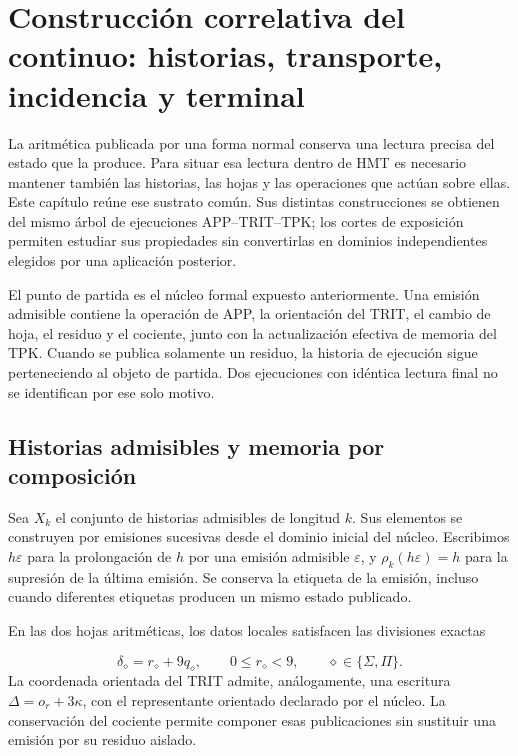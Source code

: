 \section{Construcción correlativa del continuo: historias, transporte, incidencia y terminal}
\label{viii:lectura:manuscrito-05}
La aritmética publicada por una forma normal conserva una lectura precisa del estado que la produce. Para situar esa lectura dentro de HMT es necesario mantener también las historias, las hojas y las operaciones que actúan sobre ellas. Este capítulo reúne ese sustrato común. Sus distintas construcciones se obtienen del mismo árbol de ejecuciones APP–TRIT–TPK; los cortes de exposición permiten estudiar sus propiedades sin convertirlas en dominios independientes elegidos por una aplicación posterior.

El punto de partida es el núcleo formal expuesto anteriormente. Una emisión admisible contiene la operación de APP, la orientación del TRIT, el cambio de hoja, el residuo y el cociente, junto con la actualización efectiva de memoria del TPK. Cuando se publica solamente un residuo, la historia de ejecución sigue perteneciendo al objeto de partida. Dos ejecuciones con idéntica lectura final no se identifican por ese solo motivo.

\subsection{Historias admisibles y memoria por composición}
Sea \(X_k\) el conjunto de historias admisibles de longitud \(k\). Sus elementos se construyen por emisiones sucesivas desde el dominio inicial del núcleo. Escribimos \(h\varepsilon\) para la prolongación de \(h\) por una emisión admisible \(\varepsilon\), y \(\rho_k(h\varepsilon)=h\) para la supresión de la última emisión. Se conserva la etiqueta de la emisión, incluso cuando diferentes etiquetas producen un mismo estado publicado.

En las dos hojas aritméticas, los datos locales satisfacen las divisiones exactas

\[
\delta_\diamond=r_\diamond+9q_\diamond,
\qquad 0\leq r_\diamond<9,
\qquad \diamond\in\{\Sigma,\Pi\}.
\]
La coordenada orientada del TRIT admite, análogamente, una escritura \(\Delta=o_r+3\kappa\), con el representante orientado declarado por el núcleo. La conservación del cociente permite componer esas publicaciones sin sustituir una emisión por su residuo aislado.

